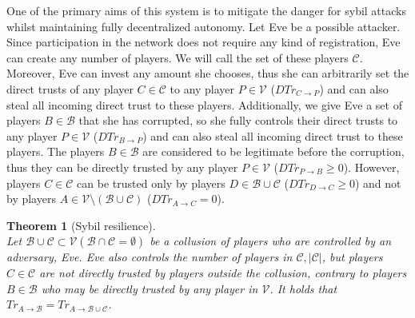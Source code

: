 \documentclass[11pt]{article}
\newtheorem{theorem}{Theorem}[section]
\theoremstyle{definition}
\theoremstyle{corollary}
\theoremstyle{lemma}
\begin{document}
    One of the primary aims of this system is to mitigate the danger for sybil attacks whilst maintaining fully decentralized
    autonomy. Let Eve be a possible attacker. Since participation in the network does not require any kind of registration,
    Eve can create any number of players. We will call the set of these players $\mathcal{C}$. Moreover, Eve can invest any
    amount she chooses, thus she can arbitrarily set the direct trusts of any player $C \in \mathcal{C}$ to any player $P \in
    \mathcal{V}$ ($DTr_{C \rightarrow P}$) and can also steal all incoming direct trust to these players. Additionally, we
    give Eve a set of players $B \in \mathcal{B}$ that she has corrupted, so she fully controls their direct trusts to any
    player $P \in \mathcal{V}$ ($DTr_{B \rightarrow P}$) and can also steal all incoming direct trust to these players. The
    players $B \in \mathcal{B}$ are considered to be legitimate before the corruption, thus they can be directly trusted by
    any player $P \in \mathcal{V}$ ($DTr_{P \rightarrow B} \geq 0$). However, players $C \in \mathcal{C}$ can be trusted only
    by players $D \in \mathcal{B} \cup \mathcal{C}$ ($DTr_{D \rightarrow C} \geq 0$) and not by players $A \in \mathcal{V}
    \setminus (\mathcal{B} \cup \mathcal{C})$ ($DTr_{A \rightarrow C} = 0$).
    \begin{theorem}[Sybil resilience] \ \\
    \label{sybil}
       Let $\mathcal{B} \cup \mathcal{C} \subset \mathcal{V} (\mathcal{B} \cap \mathcal{C} = \emptyset)$ be a collusion of
       players who are controlled by an adversary, Eve. Eve also controls the number of players in $\mathcal{C},
       |\mathcal{C}|$, but players $C \in \mathcal{C}$ are not directly trusted by players outside the collusion, contrary
       to players $B \in \mathcal{B}$ who may be directly trusted by any player in $\mathcal{V}$. It holds that
       $Tr_{A \rightarrow \mathcal{B}} = Tr_{A \rightarrow \mathcal{B} \cup \mathcal{C}}$.
    \end{theorem}
\end{document}

